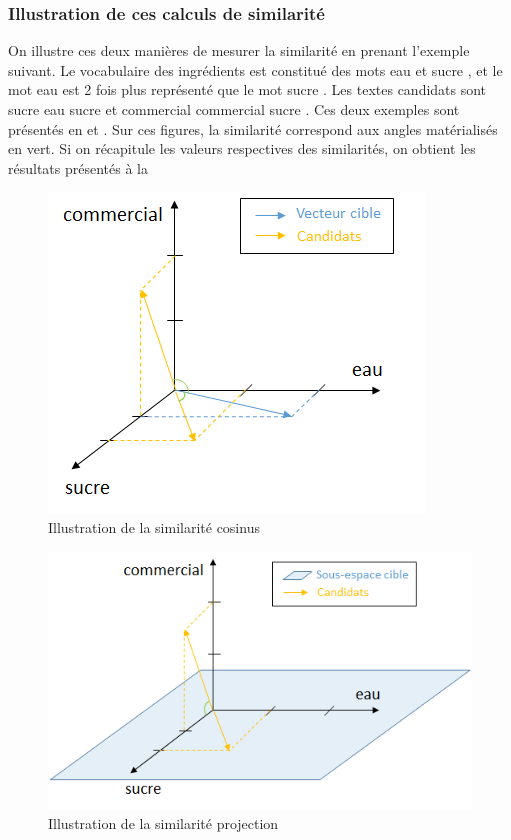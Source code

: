             \subsubsection{Illustration de ces calculs de similarité}

            On illustre ces deux manières de mesurer la similarité en prenant l'exemple suivant.
            Le vocabulaire des ingrédients est constitué des mots \og eau \fg et \og sucre \fg, et le mot \og eau \fg est 2 fois plus représenté que le mot \og sucre \fg.
            Les textes candidats sont \og sucre eau sucre \fg et \og commercial commercial sucre \fg.
            Ces deux exemples sont présentés en  et .
            Sur ces figures, la similarité correspond aux angles matérialisés en vert.
            Si on récapitule les valeurs respectives des similarités, on obtient les résultats présentés à la 
            
            \begin{figure}[htbp]
                \begin{center}
                \includegraphics[width=0.5\linewidth]{img/similarite_cosinus.png}
                \end{center}
                \caption{Illustration de la similarité cosinus}
                \label{fig:similarite_cosinus}
            \end{figure}     

            \begin{figure}[htbp]
                \begin{center}
                \includegraphics[width=0.6\linewidth]{img/similarite_projection.png}
                \end{center}
                \caption{Illustration de la similarité projection}
                \label{fig:similarite_projection}
            \end{figure}     


